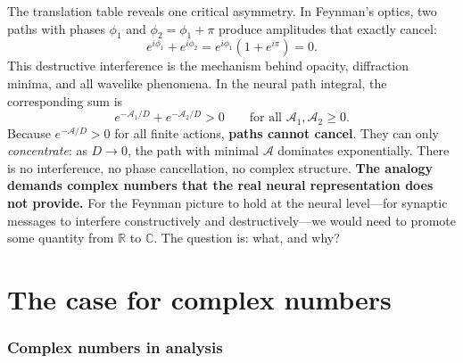 \documentclass[11pt,a4paper]{article}
\newcommand{\R}{\mathbb{R}}
\newcommand{\C}{\mathbb{C}}
\begin{document}
The translation table reveals one critical asymmetry. In Feynman's optics, two paths with phases $\phi_1$ and $\phi_2 = \phi_1 + \pi$ produce amplitudes that exactly cancel:
\begin{equation}
e^{i\phi_1} + e^{i\phi_2} = e^{i\phi_1}(1 + e^{i\pi}) = 0.
\end{equation}
This destructive interference is the mechanism behind opacity, diffraction minima, and all wavelike phenomena. In the neural path integral, the corresponding sum is
\begin{equation}
e^{-\mathcal{A}_1/D} + e^{-\mathcal{A}_2/D} > 0 \qquad \text{for all } \mathcal{A}_1, \mathcal{A}_2 \geq 0.
\label{eq:no_cancellation}
\end{equation}
Because $e^{-\mathcal{A}/D} > 0$ for all finite actions, \textbf{paths cannot cancel}. They can only \emph{concentrate}: as $D \to 0$, the path with minimal $\mathcal{A}$ dominates exponentially. There is no interference, no phase cancellation, no complex structure. \textbf{The analogy demands complex numbers that the real neural representation does not provide.} For the Feynman picture to hold at the neural level---for synaptic messages to interfere constructively and destructively---we would need to promote some quantity from $\R$ to $\C$. The question is: what, and why?


\part{The case for complex numbers}

\section{Complex numbers in analysis}
\label{sec:complex_analysis}
\end{document}
